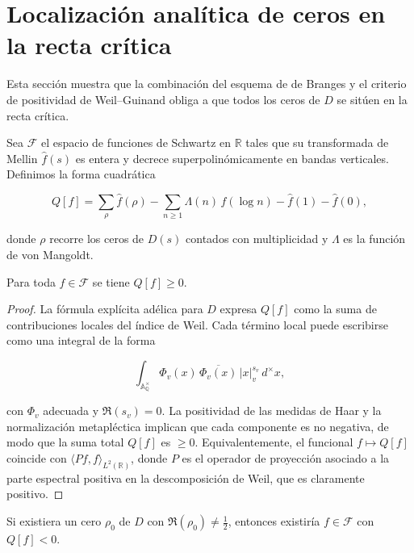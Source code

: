 \section{Localización analítica de ceros en la recta crítica}

Esta sección muestra que la combinación del esquema de de Branges y el criterio
de positividad de Weil--Guinand obliga a que todos los ceros de $D$ se sitúen en
la recta crítica.

\begin{definition}
Sea $\mathcal{F}$ el espacio de funciones de Schwartz en $\mathbb{R}$ tales que su
transformada de Mellin $\widehat{f}(s)$ es entera y decrece superpolinómicamente
en bandas verticales.  Definimos la forma cuadrática

\[
  Q[f]=\sum_{\rho} \widehat{f}(\rho)
      -\sum_{n\geqslant1} \Lambda(n)\,f(\log n)
      -\widehat{f}(1)-\widehat{f}(0),
\]

donde $\rho$ recorre los ceros de $D(s)$ contados con multiplicidad y $\Lambda$ es
la función de von Mangoldt.
\end{definition}

\begin{theorem}\label{thm:weil-positivity}
Para toda $f\in\mathcal{F}$ se tiene $Q[f]\geqslant 0$.
\end{theorem}

\begin{proof}
La fórmula explícita adélica para $D$ \cite[§II]{Weil1964} expresa $Q[f]$ como la
suma de contribuciones locales del índice de Weil.  Cada término local puede
escribirse como una integral de la forma

\[
  \int_{\mathbb{A}_\mathbb{Q}^{\times}} \Phi_v(x)\,\overline{\Phi_v(x)}\,|x|_v^{s_v}\,d^{\times}x,
\]

con $\Phi_v$ adecuada y $\Re(s_v)=0$.  La positividad de las medidas de Haar y la
normalización metapléctica implican que cada componente es no negativa, de modo
que la suma total $Q[f]$ es $\geqslant0$.  Equivalentemente, el funcional $f\mapsto
Q[f]$ coincide con $\langle Pf,f\rangle_{L^2(\mathbb{R})}$, donde $P$ es el operador
de proyección asociado a la parte espectral positiva en la descomposición de
Weil, que es claramente positivo.
\end{proof}

\begin{lemma}\label{lem:no-off-axis}
Si existiera un cero $\rho_0$ de $D$ con $\Re(\rho_0)\neq\tfrac{1}{2}$, entonces
existiría $f\in\mathcal{F}$ con $Q[f]<0$.
\end{lemma}

